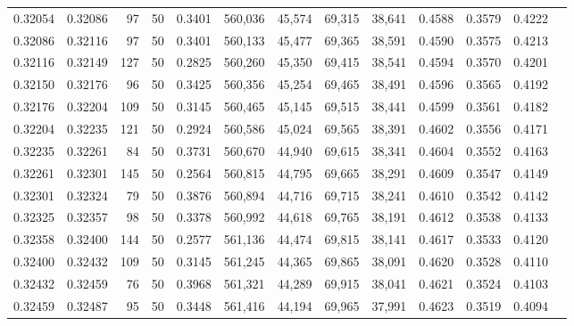 \begin{tabular}{rrrrrrrrrrrrr}
0.32054 & 0.32086 &    97 &  50 &                                     0.3401 & 560,036 &  45,574 &  69,315 &  38,641 & 0.4588 & 0.3579 & 0.4222 \\
0.32086 & 0.32116 &    97 &  50 &                                     0.3401 & 560,133 &  45,477 &  69,365 &  38,591 & 0.4590 & 0.3575 & 0.4213 \\
0.32116 & 0.32149 &   127 &  50 &                                     0.2825 & 560,260 &  45,350 &  69,415 &  38,541 & 0.4594 & 0.3570 & 0.4201 \\
0.32150 & 0.32176 &    96 &  50 &                                     0.3425 & 560,356 &  45,254 &  69,465 &  38,491 & 0.4596 & 0.3565 & 0.4192 \\
0.32176 & 0.32204 &   109 &  50 &                                     0.3145 & 560,465 &  45,145 &  69,515 &  38,441 & 0.4599 & 0.3561 & 0.4182 \\
0.32204 & 0.32235 &   121 &  50 &                                     0.2924 & 560,586 &  45,024 &  69,565 &  38,391 & 0.4602 & 0.3556 & 0.4171 \\
0.32235 & 0.32261 &    84 &  50 &                                     0.3731 & 560,670 &  44,940 &  69,615 &  38,341 & 0.4604 & 0.3552 & 0.4163 \\
0.32261 & 0.32301 &   145 &  50 &                                     0.2564 & 560,815 &  44,795 &  69,665 &  38,291 & 0.4609 & 0.3547 & 0.4149 \\
0.32301 & 0.32324 &    79 &  50 &                                     0.3876 & 560,894 &  44,716 &  69,715 &  38,241 & 0.4610 & 0.3542 & 0.4142 \\
0.32325 & 0.32357 &    98 &  50 &                                     0.3378 & 560,992 &  44,618 &  69,765 &  38,191 & 0.4612 & 0.3538 & 0.4133 \\
0.32358 & 0.32400 &   144 &  50 &                                     0.2577 & 561,136 &  44,474 &  69,815 &  38,141 & 0.4617 & 0.3533 & 0.4120 \\
0.32400 & 0.32432 &   109 &  50 &                                     0.3145 & 561,245 &  44,365 &  69,865 &  38,091 & 0.4620 & 0.3528 & 0.4110 \\
0.32432 & 0.32459 &    76 &  50 &                                     0.3968 & 561,321 &  44,289 &  69,915 &  38,041 & 0.4621 & 0.3524 & 0.4103 \\
0.32459 & 0.32487 &    95 &  50 &                                     0.3448 & 561,416 &  44,194 &  69,965 &  37,991 & 0.4623 & 0.3519 & 0.4094 \\

\end{tabular}
